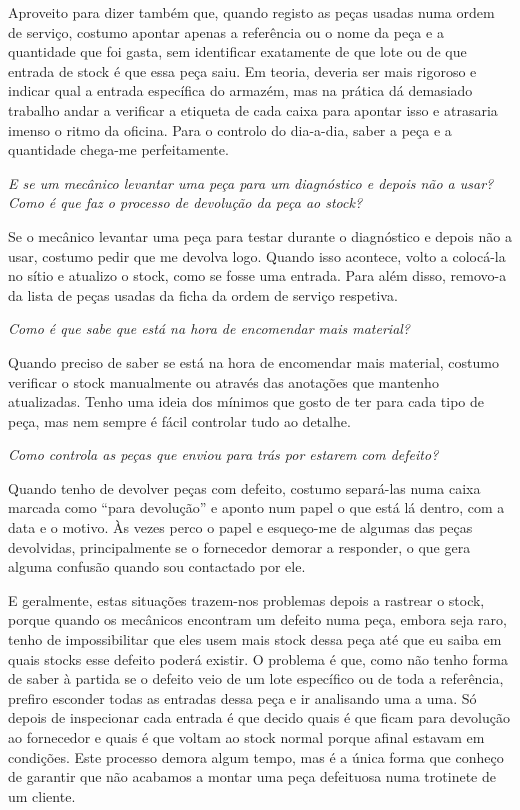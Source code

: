 \documentclass[11pt,a4paper]{article}
\newcommand{\pergunta}[1]{\item[P:] \textit{#1}}
\newcommand{\resposta}[1]{\item[R:] #1}
\begin{document}
\begin{transcription}
{			Aproveito para dizer também que, quando registo as peças usadas numa ordem de serviço, costumo apontar apenas a referência ou o nome da peça e a quantidade que foi gasta, sem identificar exatamente de que lote ou de que entrada de stock é que essa peça saiu. Em teoria, deveria ser mais rigoroso e indicar qual a entrada específica do armazém, mas na prática dá demasiado trabalho andar a verificar a etiqueta de cada caixa para apontar isso e atrasaria imenso o ritmo da oficina. Para o controlo do dia-a-dia, saber a peça e a quantidade chega-me perfeitamente.}
		
		\pergunta{E se um mecânico levantar uma peça para um diagnóstico e depois não a usar? Como é que faz o processo de devolução da peça ao stock?}
		\resposta{Se o mecânico levantar uma peça para testar durante o diagnóstico e depois não a usar, costumo pedir que me devolva logo. Quando isso acontece, volto a colocá-la no sítio e atualizo o stock, como se fosse uma entrada. Para além disso, removo-a da lista de peças usadas da ficha da ordem de serviço respetiva.}
		
		\pergunta{Como é que sabe que está na hora de encomendar mais material?}
		\resposta{Quando preciso de saber se está na hora de encomendar mais material, costumo verificar o stock manualmente ou através das anotações que mantenho atualizadas. Tenho uma ideia dos mínimos que gosto de ter para cada tipo de peça, mas nem sempre é fácil controlar tudo ao detalhe. }
		
		\pergunta{Como controla as peças que enviou para trás por estarem com defeito?}
		\resposta{Quando tenho de devolver peças com defeito, costumo separá-las numa caixa marcada como “para devolução” e aponto num papel o que está lá dentro, com a data e o motivo.
			Às vezes perco o papel e esqueço-me de algumas das peças devolvidas, principalmente se o fornecedor demorar a responder, o que gera alguma confusão quando sou contactado por ele.
			
			E geralmente, estas situações trazem-nos problemas depois a rastrear o stock, porque quando os mecânicos encontram um defeito numa peça, embora seja raro, tenho de impossibilitar que eles usem mais stock dessa peça até que eu saiba em quais stocks esse defeito poderá existir. O problema é que, como não tenho forma de saber à partida se o defeito veio de um lote específico ou de toda a referência, prefiro esconder todas as entradas dessa peça e ir analisando uma a uma. Só depois de inspecionar cada entrada é que decido quais é que ficam para devolução ao fornecedor e quais é que voltam ao stock normal porque afinal estavam em condições. Este processo demora algum tempo, mas é a única forma que conheço de garantir que não acabamos a montar uma peça defeituosa numa trotinete de um cliente.}
		

\end{transcription}
\end{document}
